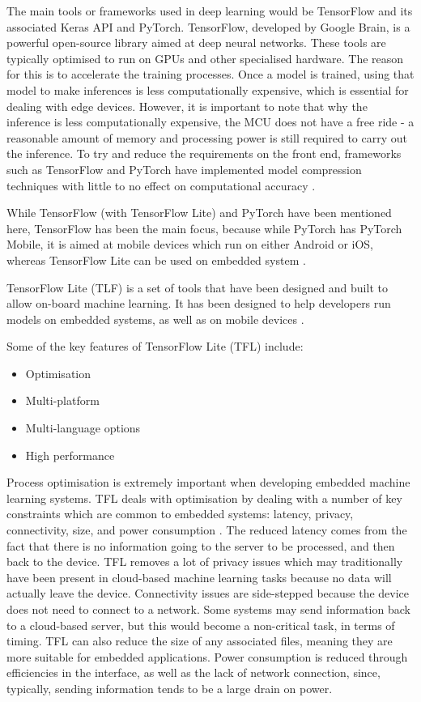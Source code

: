 \documentclass[conference]{IEEEtran}
\begin{document}
The main tools or frameworks used in deep learning would be TensorFlow and its associated Keras API and PyTorch. TensorFlow, developed by Google Brain, is a powerful open-source library aimed at deep neural networks. These tools are typically optimised to run on GPUs and other specialised hardware. The reason for this is to accelerate the training processes. Once a model is trained, using that model to make inferences is less computationally expensive, which is essential for dealing with edge devices. However, it is important to note that why the inference is less computationally expensive, the MCU does not have a free ride - a reasonable amount of memory and processing power is still required to carry out the inference. To try and reduce the requirements on the front end, frameworks such as TensorFlow and PyTorch have implemented model compression techniques with little to no effect on computational accuracy \cite{b9}. 

While TensorFlow (with TensorFlow Lite) and PyTorch have been mentioned here, TensorFlow has been the main focus, because while PyTorch has PyTorch Mobile, it is aimed at mobile devices which run on either Android or iOS, whereas TensorFlow Lite can be used on embedded system \cite{b9} \cite{b12}.

TensorFlow Lite (TLF) is a set of tools that have been designed and built to allow on-board machine learning. It has been designed to help developers run models on embedded systems, as well as on mobile devices \cite{b12}.

Some of the key features of TensorFlow Lite (TFL) include:

\begin{itemize}
    \item Optimisation
    \item Multi-platform
    \item Multi-language options
    \item High performance
\end{itemize}

Process optimisation is extremely important when developing embedded machine learning systems. TFL deals with optimisation by dealing with a number of key constraints which are common to embedded systems: latency, privacy, connectivity, size, and power consumption \cite{b7}. The reduced latency comes from the fact that there is no information going to the server to be processed, and then back to the device. TFL removes a lot of privacy issues which may traditionally have been present in cloud-based machine learning tasks because no data will actually leave the device. Connectivity issues are side-stepped because the device does not need to connect to a network. Some systems may send information back to a cloud-based server, but this would become a non-critical task, in terms of timing. TFL can also reduce the size of any associated files, meaning they are more suitable for embedded applications. Power consumption is reduced through efficiencies in the interface, as well as the lack of network connection, since, typically, sending information tends to be a large drain on power.
\end{document}
